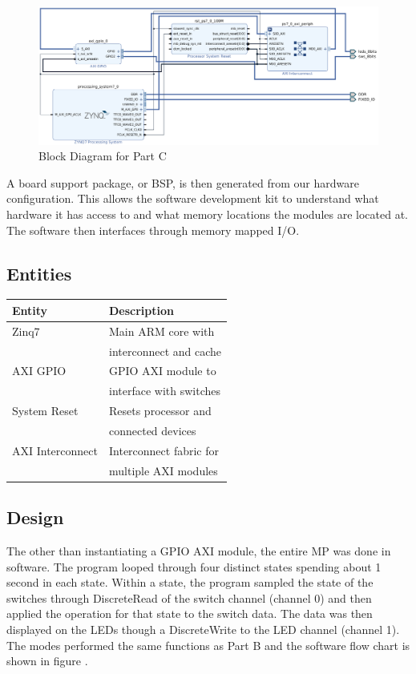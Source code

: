 \documentclass[letterpaper, 10 pt, conference]{IEEEconf}  %
\begin{document}
\begin{figure}[thpb]
   \centering
   \parbox{3in}{\centering\includegraphics[scale=0.4]{img/mp1c_diagram.PNG}}
   \caption{Block Diagram for Part C}
   \label{figurelabel}
\end{figure}

A board support package, or BSP, is then generated from our hardware configuration. This allows the software development kit to understand what hardware it has access to and what memory locations the modules are located at. The software then interfaces through memory mapped I/O.

\subsection{Entities}
\begin{table}[H]
\centering
\begin{tabular}{|l|l|}
\hline
\rowcolor[HTML]{EFEFEF} 
Entity           & Description \\ \hline
Zinq7            & Main ARM core with\\ 
                 & interconnect and cache \\ \hline
AXI GPIO         & GPIO AXI module to\\
                 & interface with switches \\ \hline
System Reset     & Resets processor and \\ 
                 & connected devices \\ \hline
AXI Interconnect & Interconnect fabric for \\ 
                 & multiple AXI modules \\ \hline
\end{tabular}
\end{table}

\subsection{Design}
The other than instantiating a GPIO AXI module, the entire MP was done in software. The program looped through four distinct states spending about 1 second in each state. Within a state, the program sampled the state of the switches through DiscreteRead of the switch channel (channel 0) and then applied the operation for that state to the switch data. The data was then displayed on the LEDs though a DiscreteWrite to the LED channel (channel 1). The modes performed the same functions as Part B and the software flow chart is shown in figure .
\end{document}
